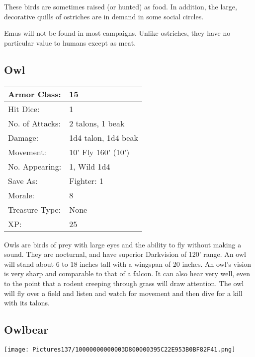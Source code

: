 \documentclass[a4paper,twoside,openany,10pt]{book}
\begin{document}
\begin{multicols}{2}
These birds are sometimes raised (or hunted) as food. In addition, the large, decorative quills of ostriches are in demand in some social
circles.

Emus will not be found in most campaigns. Unlike ostriches, they have no particular value to humans except as meat.

\subsection*{Owl}\label{owl}

\begin{tabularx}{0.50\textwidth}{@{}lX@{}}
Armor Class: & 15 \\\hline
Hit Dice: & 1 \\\hline
No. of Attacks: & 2 talons, 1 beak \\\hline
Damage: & 1d4 talon, 1d4 beak \\\hline
Movement: & 10' Fly 160' (10') \\\hline
No. Appearing: & 1, Wild 1d4 \\\hline
Save As: & Fighter: 1 \\\hline
Morale: & 8 \\\hline
Treasure Type: & None \\\hline
XP: & 25 \\\hline
\end{tabularx}\medskip

Owls are birds of prey with large eyes and the ability to fly without making a sound. They are nocturnal, and have superior Darkvision of 120' range. An owl will stand about 6 to 18 inches tall with a wingspan of 20 inches. An owl's vision is very sharp and comparable to that of a falcon. It can also hear very well, even to the point that a rodent creeping through grass will draw attention. The owl will fly over a field and listen and watch for movement and then dive for a kill with its talons.

\subsection*{Owlbear}\label{owlbear}


\begin{center} \texttt{[image: Pictures137/10000000000003D800000395C22E953B0BF82F41.png]} \end{center}


\end{multicols}
\end{document}
